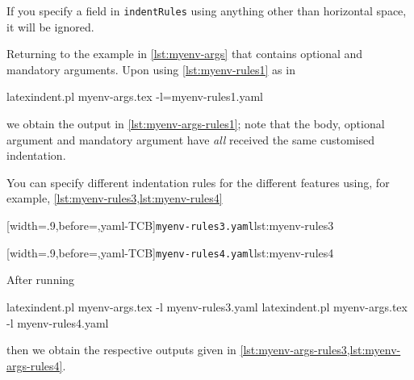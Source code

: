 
	If you specify a field in \texttt{indentRules} using anything other than horizontal space, it will be ignored.

	Returning to the example in \cref{lst:myenv-args} that contains optional and mandatory arguments. Upon using \cref{lst:myenv-rules1} as in
	\begin{commandshell}
latexindent.pl myenv-args.tex -l=myenv-rules1.yaml  
\end{commandshell}
	we obtain the output in \cref{lst:myenv-args-rules1}; note that the body, optional argument and mandatory argument have \emph{all}
	received the same customised indentation.

	You can specify different indentation rules for the different features using, for example, \cref{lst:myenv-rules3,lst:myenv-rules4}

	\begin{minipage}{.49\textwidth}
		[width=.9\linewidth,before=\centering,yaml-TCB]{\texttt{myenv-rules3.yaml}}{lst:myenv-rules3}
	\end{minipage}
	\hfill
	\begin{minipage}{.49\textwidth}
		[width=.9\linewidth,before=\centering,yaml-TCB]{\texttt{myenv-rules4.yaml}}{lst:myenv-rules4}
	\end{minipage}

	After running
	\begin{commandshell}
latexindent.pl myenv-args.tex -l myenv-rules3.yaml  
latexindent.pl myenv-args.tex -l myenv-rules4.yaml  
\end{commandshell}
	then we obtain the respective outputs given in \cref{lst:myenv-args-rules3,lst:myenv-args-rules4}.

	\begin{minipage}{.45\textwidth}
	\end{minipage}
	\hfill
	\begin{minipage}{.45\textwidth}
	\end{minipage}

